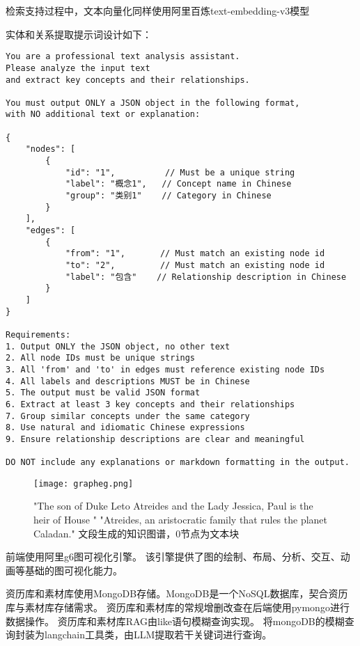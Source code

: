 \documentclass{xmu}
\begin{document}
    检索支持过程中，文本向量化同样使用阿里百炼text-embedding-v3模型

    实体和关系提取提示词设计如下：
\begin{verbatim}
You are a professional text analysis assistant. 
Please analyze the input text 
and extract key concepts and their relationships.

You must output ONLY a JSON object in the following format, 
with NO additional text or explanation:

{
    "nodes": [
        {
            "id": "1",          // Must be a unique string
            "label": "概念1",   // Concept name in Chinese
            "group": "类别1"    // Category in Chinese
        }
    ],
    "edges": [
        {
            "from": "1",       // Must match an existing node id
            "to": "2",         // Must match an existing node id
            "label": "包含"    // Relationship description in Chinese
        }
    ]
}

Requirements:
1. Output ONLY the JSON object, no other text
2. All node IDs must be unique strings
3. All 'from' and 'to' in edges must reference existing node IDs
4. All labels and descriptions MUST be in Chinese
5. The output must be valid JSON format
6. Extract at least 3 key concepts and their relationships
7. Group similar concepts under the same category
8. Use natural and idiomatic Chinese expressions
9. Ensure relationship descriptions are clear and meaningful

DO NOT include any explanations or markdown formatting in the output.
\end{verbatim}
    
    \begin{figure}[!htb]
        \centering
        \texttt{[image: grapheg.png]}\\
        \caption{
        "The son of Duke Leto Atreides and the Lady Jessica, Paul is the heir of House "
        "Atreides, an aristocratic family that rules the planet Caladan."
        文段生成的知识图谱，0节点为文本块
        }\label{example}
    \end{figure}

    前端使用阿里g6图可视化引擎。
    该引擎提供了图的绘制、布局、分析、交互、动画等基础的图可视化能力。

    资历库和素材库使用MongoDB存储。MongoDB是一个NoSQL数据库，契合资历库与素材库存储需求。
    资历库和素材库的常规增删改查在后端使用pymongo进行数据操作。
    资历库和素材库RAG由like语句模糊查询实现。
    将mongoDB的模糊查询封装为langchain工具类，由LLM提取若干关键词进行查询。
    
\end{document}
